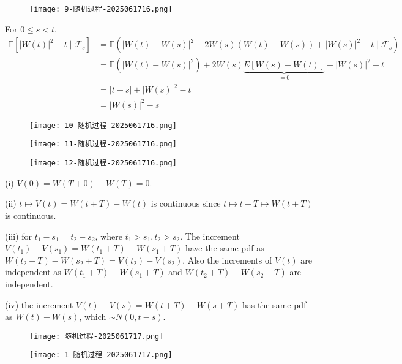 \begin{figure}[H]
\centering
\texttt{[image: 9-随机过程-2025061716.png]}
\label{}
\end{figure}

For $0\leq s<t$,
\[
\begin{aligned}
\mathbb{E}[\lvert W(t) \rvert ^{2}-t\mid \mathcal{F}_{s}] & =\mathbb{E}(\lvert W(t)-W(s) \rvert ^{2}+2W(s)(W(t)-W(s))+\lvert W(s) \rvert ^{2}-t\mid \mathcal{F}_{s}) \\
 & =\mathbb{E}(\lvert W(t)-W(s) \rvert ^{2})+2W(s)\underbrace{ E[W(s)-W(t)] }_{ =0 }+\lvert W(s) \rvert ^{2}-t \\
 & =\lvert t-s \rvert +\lvert W(s) \rvert ^{2}-t \\
 & =\lvert W(s) \rvert  ^{2}-s
\end{aligned}
\]
\begin{figure}[H]
\centering
\texttt{[image: 10-随机过程-2025061716.png]}
\label{}
\end{figure}
\begin{figure}[H]
\centering
\texttt{[image: 11-随机过程-2025061716.png]}
\label{}
\end{figure}

\begin{figure}[H]
\centering
\texttt{[image: 12-随机过程-2025061716.png]}
\label{}
\end{figure}

(i) $V(0)=W(T+0)-W(T)=0$.

(ii) $t\mapsto V(t)=W(t+T)-W(t)$ is continuous since $t\mapsto t+T\mapsto W(t+T)$ is continuous.

(iii) for $t_1-s_1=t_2-s_2$, where $t_1>s_1,t_2>s_2$. The increment $V(t_1)-V(s_1)=W(t_1+T)-W(s_1+T)$ have the same pdf as $W(t_2+T)-W(s_2+T)=V(t_2)-V(s_2)$. Also the increments of $V(t)$ are independent as $W(t_1+T)-W(s_1+T)$ and $W(t_2+T)-W(s_2+T)$ are independent.

(iv) the increment $V(t)-V(s)=W(t+T)-W(s+T)$ has the same pdf as $W(t)-W(s)$, which $\sim N(0,t-s)$.

\begin{figure}[H]
\centering
\texttt{[image: 随机过程-2025061717.png]}
\label{}
\end{figure}

\begin{figure}[H]
\centering
\texttt{[image: 1-随机过程-2025061717.png]}
\label{}
\end{figure}

